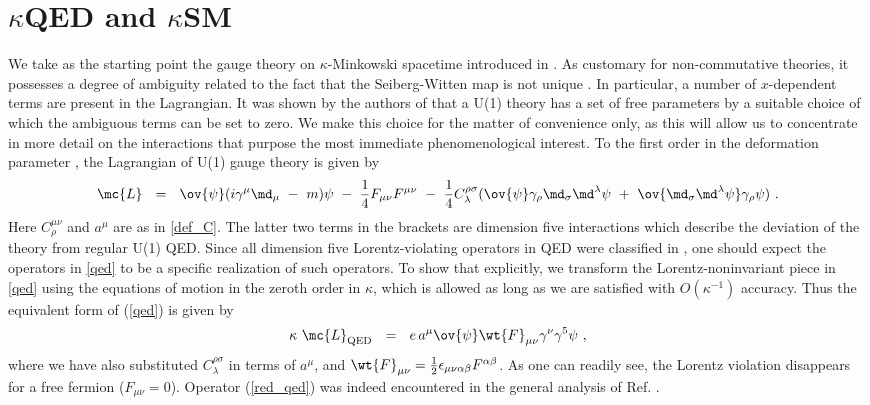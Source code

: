 \documentclass[prl,tightenlines]{revtex4}
\begin{document}
\section{$\kappa$QED and $\kappa$SM}
We take as the starting point the gauge theory on $\kappa$-Minkowski spacetime introduced in
\cite{Dimitrijevic:2003wv,Dimitrijevic:2003pn,Dimitrijevic:2005xw}.
As customary for non-commutative theories, it possesses a degree of ambiguity related
to the fact that the Seiberg-Witten map is not unique \cite{Barnich:2002pb}.
In particular, a number of $x$-dependent terms are present in the Lagrangian.
It was shown by the authors of \cite{Dimitrijevic:2005xw} that a U(1) theory has
a set of free parameters by a suitable choice of which the ambiguous terms can be set to zero. 
We make this choice for the matter of convenience only, as this will allow us to
concentrate in more detail on the interactions that purpose the most immediate
phenomenological interest.
To the first order in the deformation parameter \cite{Dimitrijevic:2005xw}, 
the Lagrangian of U(1) gauge theory is given by
\begin{align}
\label{qed}
\mc{L} ~~=~~  \ov{\psi} ( i\gamma^\mu \md_\mu ~-~ m ) \psi ~-~ \frac{1}{4}F_{\mu\nu}F^{\mu\nu}
	~-~ \frac{1}{4} C_\lambda^{\rho\sigma} 
	( \ov{\psi} \gamma_\rho \md_\sigma \md^\lambda \psi ~+~
		\ov{\md_\sigma \md^\lambda \psi} \gamma_\rho \psi )~.
\end{align}
Here $ C^{\mu\nu}_\rho $ and $ a^\mu $ are as in \eqref{def_C}.
The latter two terms in the brackets are dimension five interactions which describe the deviation of the theory 
from regular U(1) QED. 
Since all dimension five Lorentz-violating operators in QED were classified in 
\cite{Bolokhov:2007yc}, one should expect the operators in \eqref{qed} to be a specific 
realization of such operators.
To show that explicitly, we transform the Lorentz-noninvariant piece in \eqref{qed} 
using the equations of motion in the zeroth order in $\kappa$, which is allowed as long as 
we are satisfied with $O(\kappa^{-1})$ accuracy. Thus the equivalent form of (\ref{qed}) is given by
\begin{equation}
\label{red_qed}
\kappa~\mc{L}_{\rm QED} ~~=~~  e\, a^\mu \ov{\psi} \wt{F}_{\mu\nu} \gamma^\nu \gamma^5 \psi~, 
\end{equation}
where we have also substituted $C^{\rho\sigma}_\lambda $ in terms of $a^\mu$, and $\wt{F}_{\mu\nu}
=\frac12\epsilon_{\mu\nu\alpha\beta}F^{\alpha\beta}$. 
As one can readily see, the Lorentz violation disappears for a free fermion ($F_{\mu\nu}=0$).
Operator (\ref{red_qed}) was indeed encountered in the general analysis of Ref. \cite{Bolokhov:2007yc}.
\end{document}
